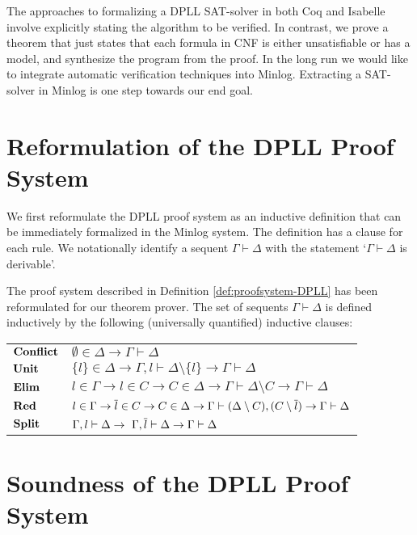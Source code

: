 The approaches \cite{SL08,FM10} to formalizing a DPLL SAT-solver in 
both Coq and Isabelle
involve explicitly stating the algorithm to be verified. In contrast, we
prove a theorem that just states that each formula in CNF is either unsatisfiable
or has a model, and synthesize the program from the proof.
In the long run we would like to integrate automatic verification techniques into Minlog. Extracting a SAT-solver in Minlog is one step towards our end goal.

\section{Reformulation of the DPLL Proof System}

We first reformulate the DPLL proof system as an inductive definition
that can be immediately formalized in the Minlog system. The definition
has a clause for each rule. We notationally identify a sequent
$\Gamma \vdash \Delta$ with the statement `$\Gamma \vdash \Delta$ is derivable'.
\medskip
\begin{myremark}
\label{def:derivable-DPLL}
The proof system described in Definition \ref{def:proofsystem-DPLL} has been reformulated for our theorem prover. The set of sequents  $\Gamma \vdash \Delta$ is 
defined inductively by the following (universally quantified) inductive clauses:
%
\begin{center}
\begin{tabular}{ll}
$\mathbf{Conflict}$ &
$\emptyset \in \Delta \to \Gamma \vdash \Delta$
\\
$\mathbf{Unit}$ &
$\{ l \} \in \Delta \to \Gamma, l \vdash 
\Delta \setminus \{l \} \to  \Gamma \vdash  \Delta$
\\
$\mathbf{Elim}$ &
$l \in \Gamma \to l \in  C \to  C \in \Delta \to  
\Gamma \vdash  \Delta \setminus C  \to   \Gamma \vdash \Delta $
\\
$\mathbf{Red}$ &
$l \in \Gamma \to \overline{l} \in C \to C \in \Delta \to \Gamma \vdash  
(\Delta \setminus C) , (C \setminus \overline{l}) \to   \Gamma \vdash \Delta$
\\
$\mathbf{Split}$ &
$\Gamma, l  \vdash \Delta 
\to  \ \Gamma, \overline{l} \vdash  \Delta \to \Gamma \vdash \Delta$
\end{tabular}
\end{center}
\end{myremark}

\section{Soundness of the DPLL Proof System}

